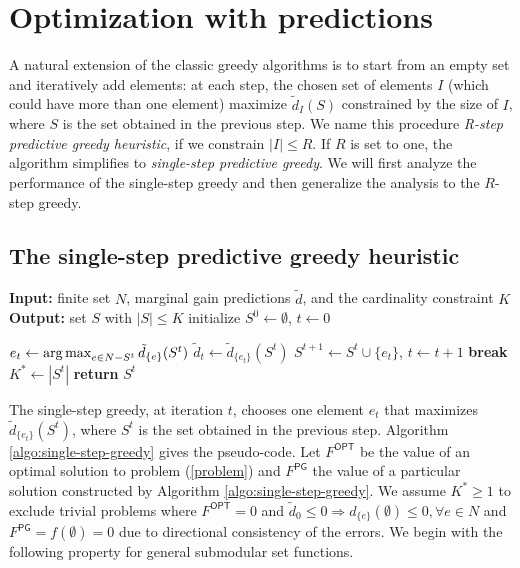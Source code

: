 \section{Optimization with predictions} \label{sec:optimization-with-predictions}


A natural extension of the classic greedy algorithms is to start from an empty set and iteratively add elements: at each step, the chosen set of elements $I$ (which could have more than one element) maximize $\tilde{d}_{I}(S)$ constrained by the size of $I$, where $S$ is the set obtained in the previous step. We name this procedure \textit{R-step predictive greedy heuristic}, if we constrain $|I| \leq R$. If $R$ is set to one, the algorithm simplifies to \textit{single-step predictive greedy}. We will first analyze the performance of the single-step greedy and then generalize the analysis to the $R$-step greedy. 

\subsection{The single-step predictive greedy heuristic}

\begin{algorithm} [tb]
\caption{Single-step Predictive Greedy} \label{algo:single-step-greedy}
\begin{algorithmic}[1]
\State \textbf{Input:} finite set $N$, marginal gain predictions $\tilde{d}$, and the cardinality constraint $K$
\State \textbf{Output:} set $S$ with $|S| \leq K$
\State initialize $S^0 \gets \emptyset$, $t \gets 0$

    \State $e_t \gets \operatorname*{arg\,max}_{e \in {N - S^t}}{\tilde{d}_{\{e\}}(S^{t})}$
    \State $\tilde{d}_{t} \gets \tilde{d}_{\{e_t\}}(S^{t})$%
        \State $S^{t+1} \gets S^{t} \cup \{ e_t \}$, $t \gets t + 1$ 
    \Else 
        \State \textbf{break} 
    \EndIf 
\EndWhile
\State $K^* \gets |S^{t}|$ 
\State \textbf{return} \( S^{t} \)
\end{algorithmic}
\end{algorithm}

The single-step greedy, at iteration $t$, chooses one element $e_t$ that maximizes $\tilde{d}_{\{e_t\}}(S^{t})$, where $S^t$ is the set obtained in the previous step. Algorithm \ref{algo:single-step-greedy} gives the pseudo-code. Let $F^{\textsf{OPT}}$ be the value of an optimal solution to problem (\ref{problem}) and $F^{\textsf{PG}}$ the value of a particular solution constructed by Algorithm \ref{algo:single-step-greedy}. We assume $K^* \geq 1$ to exclude trivial problems where $F^{\textsf{OPT}} = 0$ and $\tilde{d}_{0} \leq 0 \Rightarrow d_{\{e\}}(\emptyset) \leq 0, \forall e \in N$ and $F^{\textsf{PG}} = f(\emptyset) = 0$ due to directional consistency of the errors. We begin with the following property for general submodular set functions.

